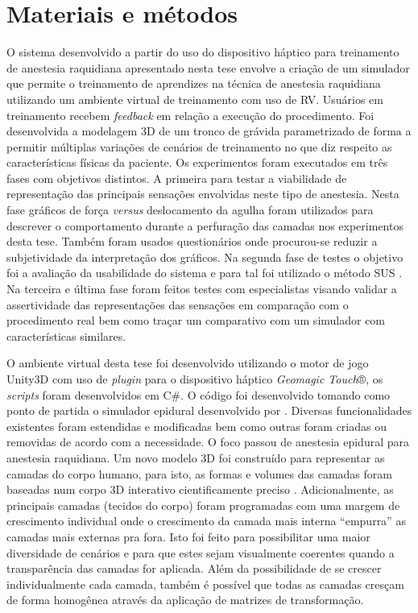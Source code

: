\chapter{Materiais e métodos} \label{cap:cap4}

O sistema desenvolvido a partir do uso do dispositivo háptico para treinamento de anestesia raquidiana apresentado nesta tese envolve a criação de um simulador que permite o treinamento de aprendizes na técnica de anestesia raquidiana utilizando um ambiente virtual de treinamento com uso de \acrshort{RV}. Usuários em treinamento recebem \textit{feedback} em relação a execução do procedimento. Foi desenvolvida a modelagem 3D de um tronco de grávida parametrizado de forma a permitir múltiplas variações de cenários de treinamento no que diz respeito as características físicas da paciente. Os experimentos foram executados em três fases com objetivos distintos. A primeira para testar a viabilidade de representação das principais sensações envolvidas neste tipo de anestesia. Nesta fase gráficos de força \textit{versus} deslocamento da agulha foram utilizados para descrever o comportamento durante a perfuração das camadas nos experimentos desta tese. Também foram usados questionários onde procurou-se reduzir a subjetividade da interpretação dos gráficos. Na segunda fase de testes o objetivo foi a avaliação da usabilidade do sistema e para tal foi utilizado o método SUS \cite{Brooke2013}. Na terceira e última fase foram feitos testes com especialistas visando validar a assertividade das representações das sensações em comparação com o procedimento real bem como traçar um comparativo com um simulador com características similares.

O ambiente virtual desta tese foi desenvolvido utilizando o motor de jogo Unity3D \cite{UnityTechnologies2020} com uso de \textit{plugin} para o dispositivo háptico \textit{Geomagic Touch}®, os \textit{scripts} foram desenvolvidos em C\#. O código foi desenvolvido tomando como ponto de partida o simulador epidural desenvolvido por \textcite{Brazil2017thesis}. Diversas funcionalidades existentes foram estendidas e modificadas bem como outras foram criadas ou removidas de acordo com a necessidade. 
O foco passou de anestesia epidural para anestesia raquidiana. Um novo modelo 3D foi construído para representar as camadas do corpo humano, para isto, as formas e volumes das camadas foram baseadas num corpo 3D interativo cientificamente preciso \cite{BioDigitalInc2019}. Adicionalmente, as principais camadas (tecidos do corpo) foram programadas com uma margem de crescimento individual onde o crescimento da camada mais interna ``empurra'' as camadas mais externas pra fora. Isto foi feito para possibilitar uma maior diversidade de cenários e para que estes sejam visualmente coerentes quando a transparência das camadas for aplicada. Além da possibilidade de se crescer individualmente cada camada, também é possível que todas as camadas cresçam de forma homogênea através da aplicação de matrizes de transformação. 

